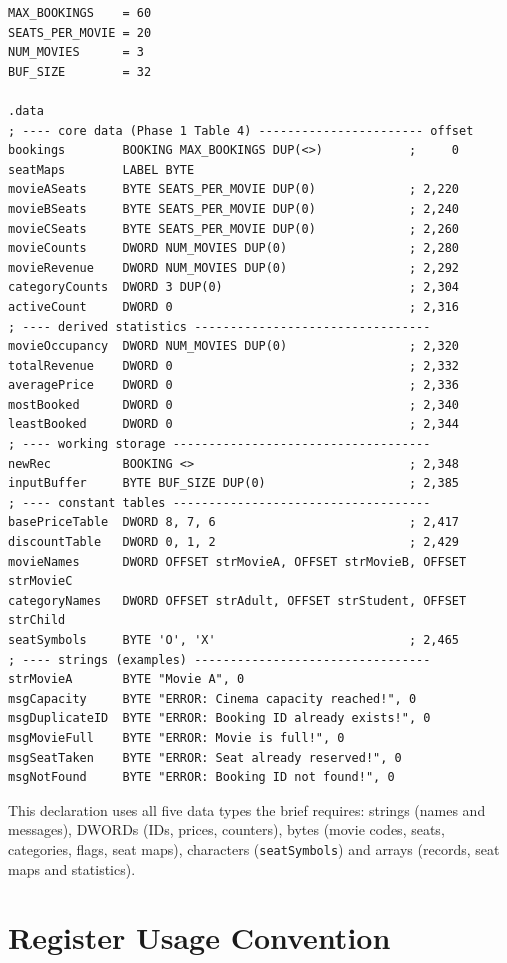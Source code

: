 \documentclass{thesis-library}
\begin{document}
\begin{lstlisting}
MAX_BOOKINGS    = 60
SEATS_PER_MOVIE = 20
NUM_MOVIES      = 3
BUF_SIZE        = 32

.data
; ---- core data (Phase 1 Table 4) ----------------------- offset
bookings        BOOKING MAX_BOOKINGS DUP(<>)            ;     0
seatMaps        LABEL BYTE
movieASeats     BYTE SEATS_PER_MOVIE DUP(0)             ; 2,220
movieBSeats     BYTE SEATS_PER_MOVIE DUP(0)             ; 2,240
movieCSeats     BYTE SEATS_PER_MOVIE DUP(0)             ; 2,260
movieCounts     DWORD NUM_MOVIES DUP(0)                 ; 2,280
movieRevenue    DWORD NUM_MOVIES DUP(0)                 ; 2,292
categoryCounts  DWORD 3 DUP(0)                          ; 2,304
activeCount     DWORD 0                                 ; 2,316
; ---- derived statistics ---------------------------------
movieOccupancy  DWORD NUM_MOVIES DUP(0)                 ; 2,320
totalRevenue    DWORD 0                                 ; 2,332
averagePrice    DWORD 0                                 ; 2,336
mostBooked      DWORD 0                                 ; 2,340
leastBooked     DWORD 0                                 ; 2,344
; ---- working storage ------------------------------------
newRec          BOOKING <>                              ; 2,348
inputBuffer     BYTE BUF_SIZE DUP(0)                    ; 2,385
; ---- constant tables ------------------------------------
basePriceTable  DWORD 8, 7, 6                           ; 2,417
discountTable   DWORD 0, 1, 2                           ; 2,429
movieNames      DWORD OFFSET strMovieA, OFFSET strMovieB, OFFSET strMovieC
categoryNames   DWORD OFFSET strAdult, OFFSET strStudent, OFFSET strChild
seatSymbols     BYTE 'O', 'X'                           ; 2,465
; ---- strings (examples) ---------------------------------
strMovieA       BYTE "Movie A", 0
msgCapacity     BYTE "ERROR: Cinema capacity reached!", 0
msgDuplicateID  BYTE "ERROR: Booking ID already exists!", 0
msgMovieFull    BYTE "ERROR: Movie is full!", 0
msgSeatTaken    BYTE "ERROR: Seat already reserved!", 0
msgNotFound     BYTE "ERROR: Booking ID not found!", 0
\end{lstlisting}

This declaration uses all five data types the brief requires: strings (names and messages), DWORDs (IDs, prices, counters), bytes (movie codes, seats, categories, flags, seat maps), characters (\texttt{seatSymbols}) and arrays (records, seat maps and statistics).

\section{Register Usage Convention}
\end{document}
